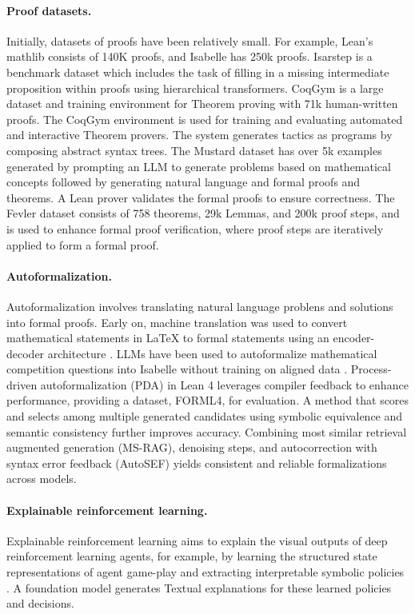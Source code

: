 \paragraph{Proof datasets.} 
Initially, datasets of proofs have been relatively small. For example, Lean's mathlib \cite{van2020maintaining} consists of 140K proofs, and Isabelle has 250k proofs. Isarstep is a benchmark dataset \cite{li2020isarstep} which includes the task of filling in a missing intermediate proposition within proofs using hierarchical transformers. CoqGym \cite{yang2019learning} is a large dataset and training environment for Theorem proving with 71k human-written proofs. The  CoqGym environment is used for training and evaluating automated and interactive Theorem provers. The system generates tactics as programs by composing abstract syntax trees. The Mustard dataset \cite{huang2024mustard} has over 5k examples generated by prompting an LLM to generate problems based on mathematical concepts followed by generating natural language and formal proofs and theorems. A Lean prover validates the formal proofs to ensure correctness. The Fevler dataset \cite{lin2024fvel} consists of 758 theorems, 29k Lemmas, and 200k proof steps, and is used to enhance formal proof verification, where proof steps are iteratively applied to form a formal proof.

\paragraph{Autoformalization.}
Autoformalization involves translating natural language problens and solutions into formal proofs. Early on, machine translation was used to convert mathematical statements in LaTeX to formal statements using an encoder-decoder architecture \cite{wang2020exploration}. LLMs have been used to autoformalize mathematical competition questions into Isabelle without training on aligned data \cite{wu2022autoformalization}. Process-driven autoformalization (PDA) \cite{lu2024process} in Lean 4 leverages compiler feedback to enhance performance, providing a dataset, FORML4, for evaluation. A method that scores and selects among multiple generated candidates using symbolic equivalence and semantic consistency \cite{li2024autoformalize} further improves accuracy. Combining most similar retrieval augmented generation (MS-RAG), denoising steps, and autocorrection with syntax error feedback (AutoSEF) \cite{zhang2024consistent} yields consistent and reliable formalizations across models. 

\paragraph{Explainable reinforcement learning.}
Explainable reinforcement learning aims to explain the visual outputs of deep reinforcement learning agents, for example, by learning the structured state representations of agent game-play and extracting interpretable symbolic policies \cite{luoend}. A foundation model generates Textual explanations for these learned policies and decisions.

